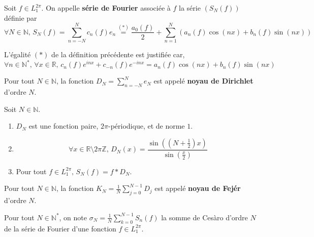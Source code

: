 
	\begin{definition}
		Soit $f \in L_1^{2\pi}$. On appelle \textbf{série de Fourier} associée à $f$ la série $(S_N(f))$ définie par
		\[ \forall N \in \mathbb{N}, \, S_N(f) = \sum_{n=-N}^{N} c_n(f) e_n \overset{(*)}{=} \frac{a_0(f)}{2} + \sum_{n = 1}^N (a_n(f) \cos(nx) + b_n(f) \sin(nx)) \]
	\end{definition}

	\begin{remark}
		L'égalité $(*)$ de la définition précédente est justifiée car,
		\[ \forall n \in \mathbb{N}^*, \, \forall x \in \mathbb{R}, \, c_n(f) e^{inx} + c_{-n}(f) e^{-inx} = a_n(f) \cos(nx) + b_n(f) \sin(nx) \]
	\end{remark}


	\begin{definition}
		Pour tout $N \in \mathbb{N}$, la fonction $D_N = \sum_{n=-N}^{N} e_N$ est appelé \textbf{noyau de Dirichlet} d'ordre $N$.
	\end{definition}

	\begin{proposition}
		Soit $N \in \mathbb{N}$.
		\begin{enumerate}[label=(\roman*)]
			\item $D_N$ est une fonction paire, $2\pi$-périodique, et de norme $1$.
			\item \[ \forall x \in \mathbb{R} \setminus 2 \pi \mathbb{Z}, \, D_N(x) = \frac{\sin \left(\left( N + \frac{1}{2} \right) x \right)}{\sin \left( \frac{x}{2} \right)} \]
			\item Pour tout $f \in L_1^{2 \pi}, \, S_N(f) = f * D_N$.
		\end{enumerate}
	\end{proposition}

	\begin{definition}
		Pour tout $N \in \mathbb{N}$, la fonction $K_N = \frac{1}{N} \sum_{j=0}^{N-1} D_j$ est appelé \textbf{noyau de Fejér} d'ordre $N$.
	\end{definition}

	\begin{notation}
		Pour tout $N \in \mathbb{N}^*$, on note $\sigma_N = \frac{1}{N} \sum_{k=0}^{N-1} S_n(f)$ la somme de Cesàro d'ordre $N$ de la série de Fourier d'une fonction $f \in L_1^{2 \pi}$.
	\end{notation}

